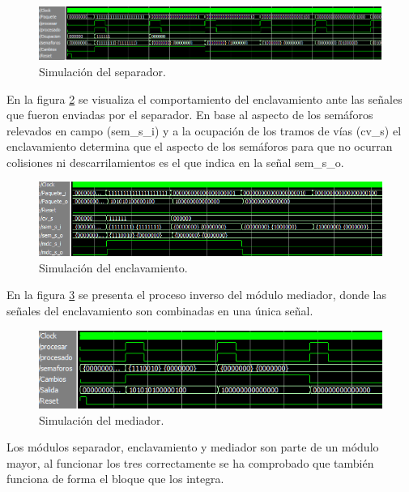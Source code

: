		\begin{figure}[!hbt]
		\centering
		\includegraphics[scale=0.55]{./Figures/Test/Separador}
			\caption{Simulación del separador.}
			\label{fig:Test_Separador}
		\end{figure}
		
		En la figura \ref{fig:Test_Enclavamiento} se visualiza el comportamiento del enclavamiento ante las señales que fueron enviadas por el separador. En base al aspecto de los semáforos relevados en campo (sem\_s\_i) y a la ocupación de los tramos de vías (cv\_s) el enclavamiento determina que el aspecto de los semáforos para que no ocurran colisiones ni descarrilamientos es el que indica en la señal sem\_s\_o.
		
		\begin{figure}[!hbt]
		\centering
		\includegraphics[scale=0.7]{./Figures/Test/Enclavamiento}
			\caption{Simulación del enclavamiento.}
			\label{fig:Test_Enclavamiento}
		\end{figure}

		
		En la figura \ref{fig:Test_Mediador} se presenta el proceso inverso del módulo mediador, donde las señales del enclavamiento son combinadas en una única señal.
		
		\begin{figure}[!hbt]
		\centering
		\includegraphics[scale=0.9]{./Figures/Test/Mediador}
			\caption{Simulación del mediador.}
			\label{fig:Test_Mediador}
		\end{figure}
		
		Los módulos separador, enclavamiento y mediador son parte de un módulo mayor, al funcionar los tres correctamente se ha comprobado que también funciona de forma el bloque que los integra.
		
